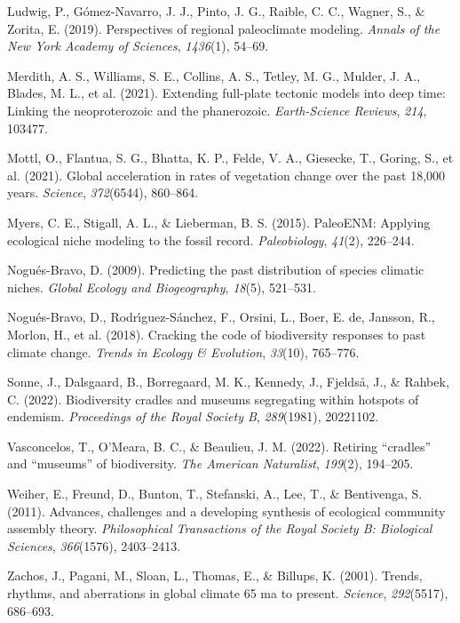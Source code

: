 \documentclass[
]{agujournal2019}
\newlength{\cslhangindent}
\newenvironment{CSLReferences}[2] %
 {\begin{list}{}{%
  \setlength{\itemindent}{0pt}
  \setlength{\leftmargin}{0pt}
  \setlength{\parsep}{0pt}
  \ifodd #1
   \setlength{\leftmargin}{\cslhangindent}
   \setlength{\itemindent}{-1\cslhangindent}
  \fi
  \setlength{\itemsep}{#2\baselineskip}}}
 {\end{list}}
\begin{document}
\begin{CSLReferences}{1}{0}
Ludwig, P., Gómez-Navarro, J. J., Pinto, J. G., Raible, C. C., Wagner,
S., \& Zorita, E. (2019). Perspectives of regional paleoclimate
modeling. \emph{Annals of the New York Academy of Sciences},
\emph{1436}(1), 54--69.

Merdith, A. S., Williams, S. E., Collins, A. S., Tetley, M. G., Mulder,
J. A., Blades, M. L., et al. (2021). Extending full-plate tectonic
models into deep time: Linking the neoproterozoic and the phanerozoic.
\emph{Earth-Science Reviews}, \emph{214}, 103477.

Mottl, O., Flantua, S. G., Bhatta, K. P., Felde, V. A., Giesecke, T.,
Goring, S., et al. (2021). Global acceleration in rates of vegetation
change over the past 18,000 years. \emph{Science}, \emph{372}(6544),
860--864.

Myers, C. E., Stigall, A. L., \& Lieberman, B. S. (2015). PaleoENM:
Applying ecological niche modeling to the fossil record.
\emph{Paleobiology}, \emph{41}(2), 226--244.

Nogués-Bravo, D. (2009). Predicting the past distribution of species
climatic niches. \emph{Global Ecology and Biogeography}, \emph{18}(5),
521--531.

Nogués-Bravo, D., Rodrı́guez-Sánchez, F., Orsini, L., Boer, E. de,
Jansson, R., Morlon, H., et al. (2018). Cracking the code of
biodiversity responses to past climate change. \emph{Trends in Ecology
\& Evolution}, \emph{33}(10), 765--776.

Sonne, J., Dalsgaard, B., Borregaard, M. K., Kennedy, J., Fjeldså, J.,
\& Rahbek, C. (2022). Biodiversity cradles and museums segregating
within hotspots of endemism. \emph{Proceedings of the Royal Society B},
\emph{289}(1981), 20221102.

Vasconcelos, T., O'Meara, B. C., \& Beaulieu, J. M. (2022). Retiring
{``cradles''} and {``museums''} of biodiversity. \emph{The American
Naturalist}, \emph{199}(2), 194--205.

Weiher, E., Freund, D., Bunton, T., Stefanski, A., Lee, T., \&
Bentivenga, S. (2011). Advances, challenges and a developing synthesis
of ecological community assembly theory. \emph{Philosophical
Transactions of the Royal Society B: Biological Sciences},
\emph{366}(1576), 2403--2413.

Zachos, J., Pagani, M., Sloan, L., Thomas, E., \& Billups, K. (2001).
Trends, rhythms, and aberrations in global climate 65 ma to present.
\emph{Science}, \emph{292}(5517), 686--693.

\end{CSLReferences}
\end{document}
